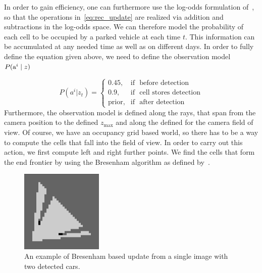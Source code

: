         In order to gain efficiency, one can furthermore use the log-odds
        formulation of~\cite{moravec1988}, so that the operations
        in~\eqref{eq:rec_update} are realized via addition and subtractions in
        the log-odds space. We can therefore model the probability of each
        cell to be occupied by a parked vehicle at each time $t$. This
        information can be accumulated at any needed time as well as on
        different days. In order to fully define the equation given above, we
        need to define the observation model $P({\mbox{a}^i} \mid z)$

        \begin{equation}
        \label{eq:observation_model}
            P(a^i | z_t) = \begin{cases} 0.45, & \mbox{if } \mbox{ before detection} \\ 0.9, & \mbox{if } \mbox{ cell stores detection} \\ \mbox{prior}, & \mbox{if } \mbox{ after detection} \end{cases}
        \end{equation}
        Furthermore, the observation model is defined along the rays, that span from the camera position to the defined $z_{\max}$ and along the defined for the camera field of view. Of course, we have an occupancy grid based world, so there has to be a way to compute the cells that fall into the field of view. In order to carry out this action, we first compute left and right further points. We find the cells that form the end frontier by using the Bresenham algorithm as defined by~\cite{bresenham1965}.
        \begin{figure}
            \begin{center}
                \includegraphics[width=0.35\textwidth]{pictures/testmap.png}
            \end{center}
            \vspace{-20pt}
            \caption{An example of Bresenham based update from a single image with two detected cars.}
            \vspace{-30pt}
            \label{fig:maptest}
        \end{figure}

